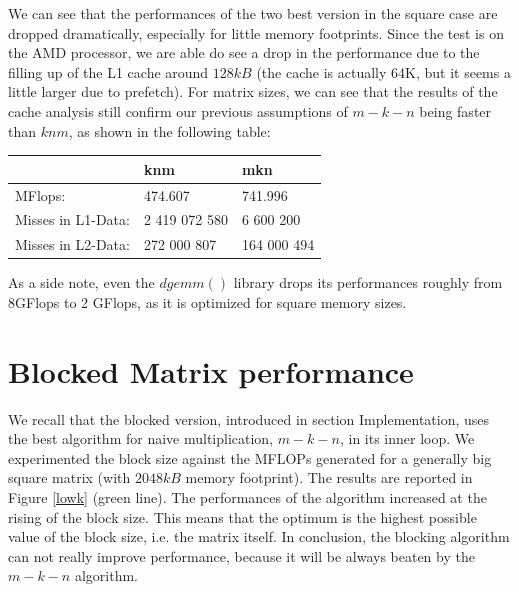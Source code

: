 We can see that the performances of the two best version in the square case are dropped dramatically, especially for little memory footprints. Since the test is on the AMD processor, we are able do see a drop in the performance due to the filling up of the L1 cache around $128kB$ (the cache is actually 64K, but it seems a little larger due to prefetch). For matrix sizes, we can see that the results of the cache analysis still confirm our previous assumptions of $m-k-n$ being faster than $knm$, as shown in the following table:


\vspace{10pt} 
\begin{tabular}{ l l l}
\hline
 & knm& mkn\\ \hline
MFlops:        &  474.607& 741.996 \\ \hline
Misses in L1-Data:     & 2 419 072 580 & 6 600 200 \\ \hline
Misses in L2-Data:     & 272 000 807 & 164 000 494\\ \hline

\end{tabular}

\vspace{10pt} 

As a side note, even the $dgemm()$ library drops its performances roughly from 8GFlops to 2 GFlops, as it is optimized for square memory sizes.

\clearpage
\section{Blocked Matrix performance}
We recall that the blocked version, introduced in section Implementation, uses the best algorithm for naive multiplication, $m-k-n$, in its inner loop. We experimented the block size against the MFLOPs generated for a generally big square matrix (with $2048kB$ memory footprint). The results are reported in Figure \ref{lowk} (green line). The performances of the algorithm increased at the rising of the block size. This means that the optimum is the highest possible value of the block size, i.e. the matrix itself. In conclusion, the blocking algorithm can not really improve performance, because it will be always beaten by the $m-k-n$ algorithm. 

